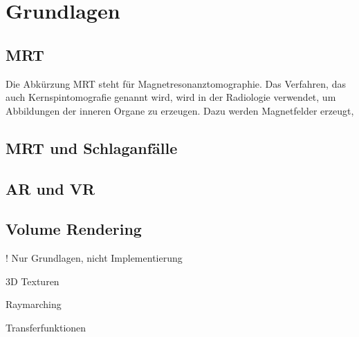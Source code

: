 
\chapter{Grundlagen}

\section{MRT}

Die Abkürzung MRT steht für Magnetresonanztomographie. Das Verfahren, das auch Kernspintomografie genannt wird, wird in der Radiologie verwendet, um Abbildungen der inneren Organe zu erzeugen. Dazu werden Magnetfelder erzeugt, 

\section{MRT und Schlaganfälle}

\section{AR und VR}

\section{Volume Rendering}

! Nur Grundlagen, nicht Implementierung

3D Texturen

Raymarching

Transferfunktionen






